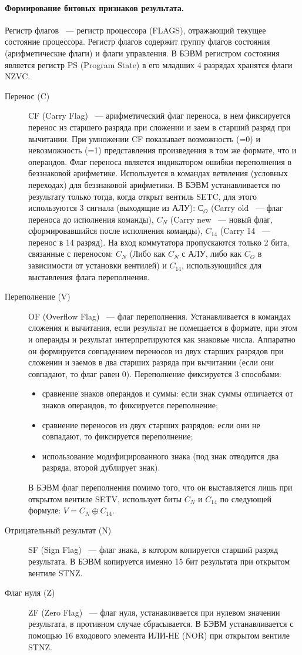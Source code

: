 \documentclass[10pt]{article}
\begin{document}
	\paragraph{Формирование битовых признаков результата.}
	Регистр флагов ~--- регистр процессора (FLAGS), отражающий текущее состояние процессора. Регистр флагов содержит группу флагов состояния (арифметические флаги) и флаги управления. В БЭВМ регистром состояния является регистр PS (Program State) в его младших 4 разрядах хранятся флаги NZVC.
	\begin{description}
		\item[Перенос (C)] CF (Carry Flag) ~--- арифметический флаг переноса, в нем фиксируется перенос из старшего разряда при сложении и заем в старший разряд при вычитании. При умножении CF показывает возможность (=0) и невозможность (=1) представления произведения в том же формате, что и операндов. Флаг переноса является индикатором ошибки переполнения в беззнаковой арифметике. Используется в командах ветвления (условных переходах) для беззнаковой арифметики. В БЭВМ устанавливается по результату только тогда, когда открыт вентиль SETC, для этого используются 3 сигнала (выходящие из АЛУ): $С_O$ (Carry old ~--- флаг переноса до исполнения команды), $C_N$ (Carry new ~--- новый флаг, сформировавшийся после исполнения команды), $C_{14}$ (Carry 14 ~--- перенос в 14 разряд). На вход коммутатора пропускаются только 2 бита, связанные с переносом: $C_N$ (Либо как $C_N$ с АЛУ, либо как $C_O$ в зависимости от установки вентилей) и $C_{14}$, использующийся для выставления флага переполнения.
		\item[Переполнение (V)] OF (Overflow Flag) ~--- флаг переполнения. Устанавливается в командах сложения и вычитания, если результат не помещается в формате, при этом и операнды и результат интерпретируются как знаковые числа. Аппаратно он формируется совпадением переносов из двух старших разрядов при сложении и заемов в два старших разряда при вычитании (если они совпадают, то флаг равен 0). Переполнение фиксируется 3 способами:
		\begin{itemize}
			\item сравнение знаков операндов и суммы: если знак суммы отличается от знаков операндов, то фиксируется переполнение;
			\item сравнение переносов из двух старших разрядов: если они не совпадают, то фиксируется переполнение;
			\item использование модифицированного знака (под знак отводится два разряда, второй дублирует знак).
		\end{itemize}
		В БЭВМ флаг переполнения помимо того, что он выставляется лишь при открытом вентиле SETV, использует биты $C_N$ и $C_{14}$ по следующей формуле: $V = C_N \oplus C_{14}$.
		\item[Отрицательный результат (N)] SF (Sign Flag) ~--- флаг знака, в котором копируется старший разряд результата. В БЭВМ копируется именно 15 бит результата при открытом вентиле STNZ.
		\item[Флаг нуля (Z)] ZF (Zero Flag) ~--- флаг нуля, устанавливается при нулевом значении результата, в противном случае сбрасывается. В БЭВМ устанавливается с помощью 16 входового элемента ИЛИ-НЕ (NOR) при открытом вентиле STNZ.
	\end{description}
\end{document}
